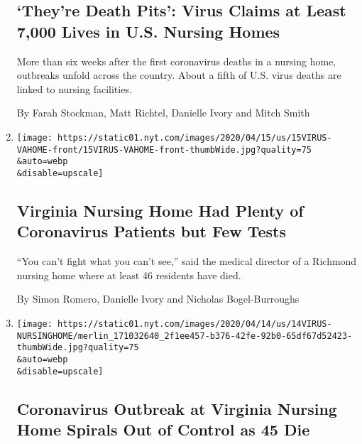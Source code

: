 \begin{enumerate}
  \hypertarget{theyre-death-pits-virus-claims-at-least-7000-lives-in-us-nursing-homes}{%
  \subsection{`They're Death Pits': Virus Claims at Least 7,000 Lives in
  U.S. Nursing
  Homes}\label{theyre-death-pits-virus-claims-at-least-7000-lives-in-us-nursing-homes}}

  More than six weeks after the first coronavirus deaths in a nursing
  home, outbreaks unfold across the country. About a fifth of U.S. virus
  deaths are linked to nursing facilities.

  By Farah Stockman, Matt Richtel, Danielle Ivory and Mitch Smith
\item
  \href{/2020/04/15/us/virginia-nursing-home-coronavirus.html}{}

  \texttt{[image: https://static01.nyt.com/images/2020/04/15/us/15VIRUS-VAHOME-front/15VIRUS-VAHOME-front-thumbWide.jpg?quality=75\\\&auto=webp\\\&disable=upscale]}

  \hypertarget{virginia-nursing-home-had-plenty-of-coronavirus-patients-but-few-tests}{%
  \subsection{Virginia Nursing Home Had Plenty of Coronavirus Patients
  but Few
  Tests}\label{virginia-nursing-home-had-plenty-of-coronavirus-patients-but-few-tests}}

  ``You can't fight what you can't see,'' said the medical director of a
  Richmond nursing home where at least 46 residents have died.

  By Simon Romero, Danielle Ivory and Nicholas Bogel-Burroughs
\item
  \href{/2020/04/14/us/coronavirus-nursing-homes.html}{}

  \texttt{[image: https://static01.nyt.com/images/2020/04/14/us/14VIRUS-NURSINGHOME/merlin\_171032640\_2f1ee457-b376-42fe-92b0-65df67d52423-thumbWide.jpg?quality=75\\\&auto=webp\\\&disable=upscale]}

  \hypertarget{coronavirus-outbreak-at-virginia-nursing-home-spirals-out-of-control-as-45-die}{%
  \subsection{Coronavirus Outbreak at Virginia Nursing Home Spirals Out
  of Control as 45
  Die}\label{coronavirus-outbreak-at-virginia-nursing-home-spirals-out-of-control-as-45-die}}


\end{enumerate}

